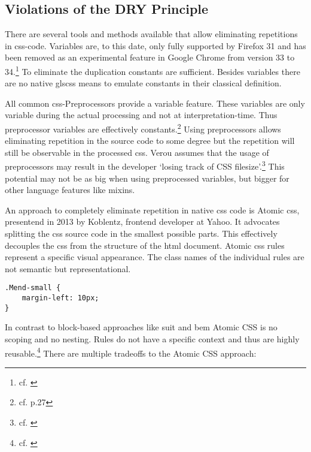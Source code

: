 \subsection{Violations of the DRY Principle}
There are several tools and methods available that allow eliminating repetitions in \gls{css}-code.
Variables are, to this date, only fully supported by Firefox 31 and has been removed as an experimental feature in Google Chrome from version 33 to 34.\footnote{cf. \cite{cssvariables}}
To eliminate the duplication constants are sufficient.
Besides variables there are no native gls{css} means to emulate constants in their classical definition.

All common \gls{css}-Preprocessors provide a variable feature.
These variables are only variable during the actual processing and not at interpretation-time.
Thus preprocessor variables are effectively constants.\footnote{cf. \cite{wirthpreprocessors} p.27}
Using preprocessors allows eliminating repetition in the source code to some degree
but the repetition will still be observable in the processed \gls{css}.
Verou assumes that the usage of preprocessors may result in the developer `losing track of CSS filesize'.\footnote{cf. \cite{veroupreprocessors}}
This potential may not be as big when using preprocessed variables, but bigger for other language features like mixins.

An approach to completely eliminate repetition in native \gls{css} code is Atomic \gls{css}, presentend in 2013 by Koblentz, frontend developer at Yahoo.
It advocates splitting the \gls{css} source code in the smallest possible parts.
This effectively decouples the \gls{css} from the structure of the \gls{html} document.
Atomic \gls{css} rules represent a specific visual appearance.
The class names of the individual rules are not semantic but representational.


\begin{lstlisting}
.Mend-small {
    margin-left: 10px;
}
\end{lstlisting}

In contrast to block-based approaches like \gls{suit} and \gls{bem} Atomic CSS is no scoping and no nesting.
Rules do not have a specific context and thus are highly reusable.\footnote{cf. \cite{atomiccssarticle}}
There are multiple tradeoffs to the Atomic CSS approach:


